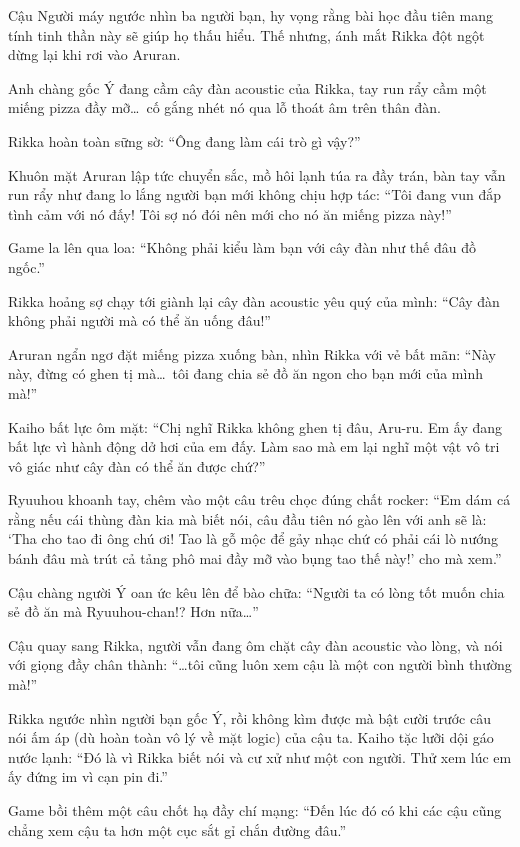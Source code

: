 \documentclass[../main.tex]{subfiles}
\begin{document}
Cậu Người máy ngước nhìn ba người bạn, hy vọng rằng bài học đầu tiên mang tính tinh thần này sẽ giúp họ thấu hiểu. Thế nhưng, ánh mắt Rikka đột ngột dừng lại khi rơi vào Aruran.

Anh chàng gốc Ý đang cầm cây đàn acoustic của Rikka, tay run rẩy cầm một miếng pizza đầy mỡ\dots\ cố gắng nhét nó qua lỗ thoát âm trên thân đàn.


Rikka hoàn toàn sững sờ: ``Ông đang làm cái trò gì vậy?''

Khuôn mặt Aruran lập tức chuyển sắc, mồ hôi lạnh túa ra đầy trán, bàn tay vẫn run rẩy như đang lo lắng người bạn mới không chịu hợp tác: ``Tôi đang vun đắp tình cảm với nó đấy! Tôi sợ nó đói nên mới cho nó ăn miếng pizza này!''

Game la lên qua loa: ``Không phải kiểu làm bạn với cây đàn như thế đâu đồ ngốc.''

Rikka hoảng sợ chạy tới giành lại cây đàn acoustic yêu quý của mình: ``Cây đàn không phải người mà có thể ăn uống đâu!''

Aruran ngẩn ngơ đặt miếng pizza xuống bàn, nhìn Rikka với vẻ bất mãn: ``Này này, đừng có ghen tị mà\dots\ tôi đang chia sẻ đồ ăn ngon cho bạn mới của mình mà!''

Kaiho bất lực ôm mặt: ``Chị nghĩ Rikka không ghen tị đâu, Aru-ru. Em ấy đang bất lực vì hành động dở hơi của em đấy. Làm sao mà em lại nghĩ một vật vô tri vô giác như cây đàn có thể ăn được chứ?''

Ryuuhou khoanh tay, chêm vào một câu trêu chọc đúng chất rocker: ``Em dám cá rằng nếu cái thùng đàn kia mà biết nói, câu đầu tiên nó gào lên với anh sẽ là: `Tha cho tao đi ông chú ơi! Tao là gỗ mộc để gảy nhạc chứ có phải cái lò nướng bánh đâu mà trút cả tảng phô mai đầy mỡ vào bụng tao thế này!' cho mà xem.''

Cậu chàng người Ý oan ức kêu lên để bào chữa: ``Người ta có lòng tốt muốn chia sẻ đồ ăn mà Ryuuhou-chan!? Hơn nữa\dots''

Cậu quay sang Rikka, người vẫn đang ôm chặt cây đàn acoustic vào lòng, và nói với giọng đầy chân thành: ``\dots tôi cũng luôn xem cậu là một con người bình thường mà!''

Rikka ngước nhìn người bạn gốc Ý, rồi không kìm được mà bật cười trước câu nói ấm áp (dù hoàn toàn vô lý về mặt logic) của cậu ta. Kaiho tặc lưỡi dội gáo nước lạnh: ``Đó là vì Rikka biết nói và cư xử như một con người. Thử xem lúc em ấy đứng im vì cạn pin đi.''

Game bồi thêm một câu chốt hạ đầy chí mạng: ``Đến lúc đó có khi các cậu cũng chẳng xem cậu ta hơn một cục sắt gỉ chắn đường đâu.''
\end{document}
